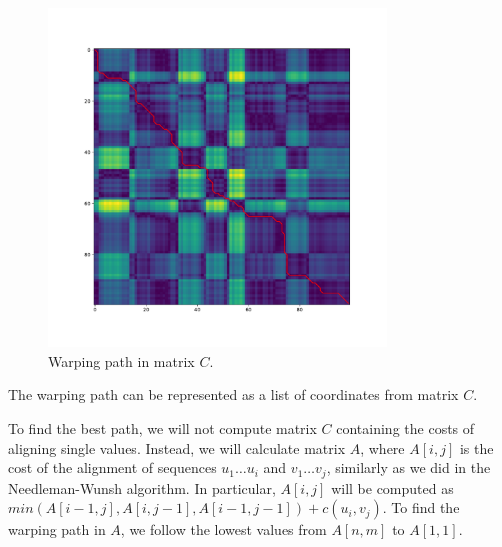 \begin{figure}[h]
  \centering
  \includegraphics[width=0.8\textwidth]{images/wp}
  \caption{Warping path in matrix $C$.}
  \label{fig:wp}
\end{figure}

The warping path can be represented as a list of coordinates from matrix $C$.

To find the best path, we will not compute matrix $C$ containing the costs of aligning single values.
Instead, we will calculate matrix $A$, where $A[i,j]$ is the cost of the alignment of sequences $u_1 \dots u_i$ and $v_1 \dots v_j$, 
similarly as we did in the Needleman-Wunsh algorithm. 
In particular, $A[i,j]$ will be computed as $min(A[i-1,j],A[i,j-1],A[i-1,j-1])+c(u_i,v_j)$. 
To find the warping path in $A$, we follow the lowest values from $A[n,m]$ to $A[1,1]$. 


